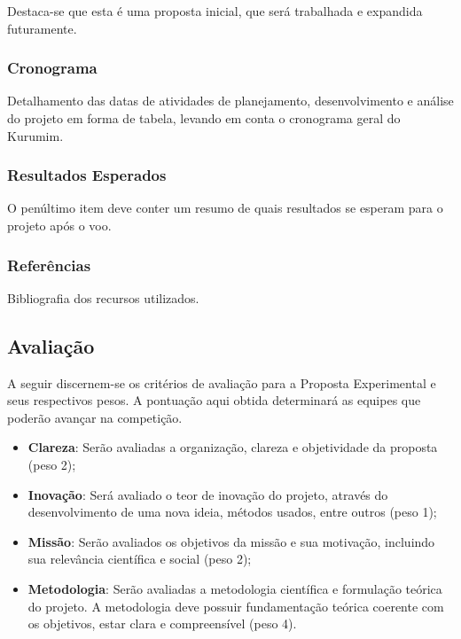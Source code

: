             Destaca-se que esta é uma proposta inicial, que será trabalhada e expandida futuramente.
            
        \subsubsection{Cronograma}
            Detalhamento das datas de atividades de planejamento, desenvolvimento e análise do projeto em forma de tabela, levando em conta o cronograma geral do Kurumim.
                
        \subsubsection{Resultados Esperados}
            O penúltimo item deve conter um resumo de quais resultados se esperam para o projeto após o voo.
                    
        \subsubsection{Referências}
            Bibliografia dos recursos utilizados.

    \subsection{Avaliação}
        A seguir discernem-se os critérios de avaliação para a Proposta Experimental e seus respectivos pesos. A pontuação aqui obtida determinará as equipes que poderão avançar na competição.
        
        \begin{itemize}
            \item \textbf{Clareza}: Serão avaliadas a organização, clareza e objetividade da proposta (peso 2);
            
            \item \textbf{Inovação}: Será avaliado o teor de inovação do projeto, através do desenvolvimento de uma nova ideia, métodos usados, entre outros (peso 1);
                     
            \item \textbf{Missão}: Serão avaliados os objetivos da missão e sua motivação, incluindo sua relevância científica e social (peso 2);
            
            \item \textbf{Metodologia}: Serão avaliadas a metodologia científica e formulação teórica do projeto. A metodologia deve possuir fundamentação teórica coerente com os objetivos, estar clara e compreensível (peso 4).
        \end{itemize}

